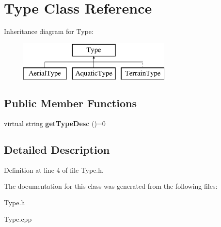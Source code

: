 \hypertarget{classType}{}\section{Type Class Reference}
\label{classType}
Inheritance diagram for Type\+:\begin{figure}[H]
\begin{center}
\leavevmode
\includegraphics[height=2.000000cm]{classType}
\end{center}
\end{figure}
\subsection*{Public Member Functions}
\begin{DoxyCompactItemize}
\item 
\mbox{\label{classType_a5c453300dc060252c30534110bd2f78c}} 
virtual string {\bfseries get\+Type\+Desc} ()=0
\end{DoxyCompactItemize}


\subsection{Detailed Description}


Definition at line 4 of file Type.\+h.



The documentation for this class was generated from the following files\+:\begin{DoxyCompactItemize}
\item 
Type.\+h\item 
Type.\+cpp\end{DoxyCompactItemize}
